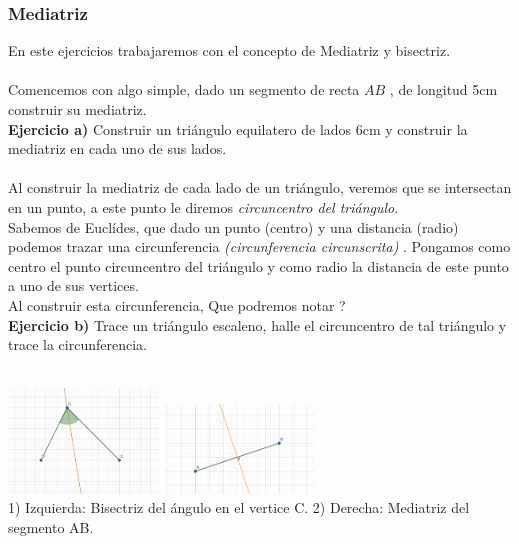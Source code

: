 \documentclass[11pt, a4paper]{article}
\begin{document}
\subsubsection*{Mediatriz}
En este ejercicios trabajaremos con el concepto de Mediatriz y bisectriz.\\ \\ 
Comencemos con algo simple, dado un segmento de recta $AB$ , de longitud 5cm construir su mediatriz.  \\ 

\textbf{ Ejercicio a) } Construir un tri\'angulo equilatero de lados 6cm y construir la mediatriz en cada uno de sus lados. \\ \\ 
Al construir la mediatriz de cada lado de un tri\'angulo, veremos que se intersectan en un punto, a este punto le diremos \textit{{\color{blue}circuncentro} del tri\'angulo}.\\
Sabemos de Eucl\'ides, que dado un punto (centro) y una distancia (radio) podemos trazar una circunferencia \textit{{\color{blue}(circunferencia circunscrita)}} . Pongamos como centro el punto circuncentro del tri\'angulo y como radio la distancia de este punto a uno de sus vertices. \\ Al construir esta circunferencia, Que podremos notar ? \\

\textbf{ Ejercicio b) } Trace un tri\'angulo escaleno, halle el circuncentro de tal tri\'angulo y trace la circunferencia. \\ \\


\begin{center}
    \includegraphics[width = 4cm]{bisectrizDCE.png} \includegraphics[width = 4cm]{mediatrizAB.png} \\ 
    \small{1) Izquierda: Bisectriz del \'angulo en el vertice C. 2) Derecha: Mediatriz del segmento AB. }
\end{center}
\end{document}
